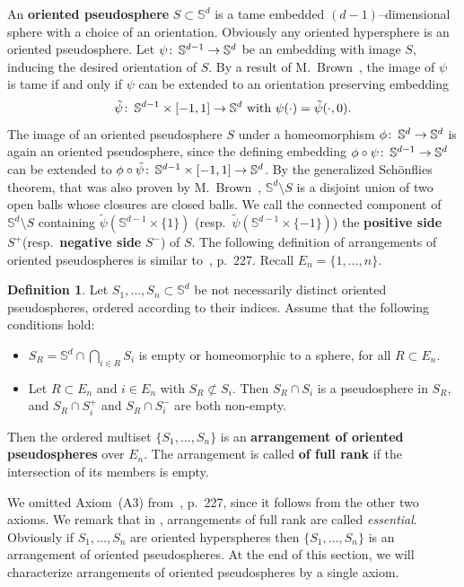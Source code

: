 \documentclass[a4paper]{amsart}
\def\co{\colon\thinspace}
\newcommand{\begriff}[1]{\textbf{#1}}
\newcommand{\p}{\mathbb S}
\theoremstyle{definition}
\newtheorem{definition}{Definition}
\theoremstyle{remark}
\begin{document}
An \begriff{oriented pseudosphere} $S\subset \p^d$ is a tame embedded 
$(d-1)$--dimensional sphere with a choice of an orientation. Obviously
any oriented hypersphere is an oriented pseudosphere. 
%
Let $\psi\co\p^{d-1}\to\p^d$ be an embedding with image $S$, inducing
the desired orientation of $S$. 
%
By a result of M.~Brown~\cite{brown2}, the image of $\psi$ is tame if
and only if $\psi$ can be extended to an orientation preserving
embedding  $$\tilde\psi\co \p^{d-1}\times [-1,1] \to \p^d \hbox{ with }
\psi(\cdot)=\tilde\psi(\cdot,0).$$
The image of an oriented pseudosphere $S$ under a homeomorphism
$\phi\co\p^d\to\p^d$ is again an oriented pseudosphere, 
since the defining embedding $\phi\circ\psi\co\p^{d-1}\to\p^d$ can be
extended to $\phi\circ\tilde\psi\co \p^{d-1}\times [-1,1] \to
\p^d$.
%
By the generalized Sch\"onflies theorem, that was also proven by
M.~Brown~\cite{brown}, $\p^d\setminus S$ is a disjoint union of two open
balls whose closures are closed balls.
%
We call the connected component of $\p^d\setminus S$ containing
$\tilde\psi(\p^{d-1}\times\{1\})$ (resp.\ $\tilde\psi(\p^{d-1}\times\{-1\})$)
the \begriff{positive side} $S^+$(resp.\ \begriff{negative side} $S^-$)
of $S$.
%
The following definition of  arrangements of oriented pseudospheres is
similar to~\cite{bjorner}, p.~227.  Recall $E_n=\{1,\dots, n\}$.

\begin{definition}
  Let $S_1,\dots, S_n\subset \p^d$ be not necessarily distinct oriented
  pseudospheres, ordered according to their indices.  
  Assume that the following conditions hold:
  \begin{itemize}
  \item[(A1)] $S_R= \p^d\cap\bigcap_{i\in R} S_i$ is empty or homeomorphic to a
    sphere, for all $R\subset E_n$. 
  \item[(A2)] Let $R\subset E_n$ and $i\in E_n$ with $S_R\not\subset
    S_i$. Then $S_R\cap S_i$ is a pseudosphere in $S_R$, and $S_R\cap  S_i^+$ 
    and $S_R\cap S_i^-$ are both non-empty. 
  \end{itemize}
  Then the ordered multiset $\{S_1,\dots, S_n\}$ is an \begriff{arrangement of
   oriented pseudospheres} over $E_n$. 
%
  The arrangement is called \begriff{of full rank} if the intersection
  of its members is empty.   
\end{definition}
We omitted Axiom~(A3) from~\cite{bjorner}, p.~227,  since it follows from the
other two axioms. We remark that in \cite{bjorner}, arrangements of full
rank are called \emph{essential}. Obviously if $S_1,\dots, S_n$ are
oriented hyperspheres then $\{S_1,\dots, S_n\}$ is an arrangement of
oriented pseudospheres. At the end of this section, we will characterize
arrangements of oriented pseudospheres by a single axiom.
\end{document}
